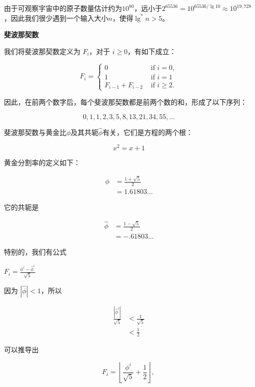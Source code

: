 \documentclass[lang=cn,newtx,10pt,scheme=chinese]{elegantbook}
\begin{document}
由于可观察宇宙中的原子数量估计约为$10^{80}$，远小于$2^{65536}=10^{65536 / \lg 10} \approx 10^{19,728}$，因此我们很少遇到一个输入大小$n$，使得$\lg ^* n>5$。

\textbf{斐波那契数}

我们将斐波那契数定义为 $F_i$，对于 $i \geq 0$，有如下成立：

\begin{equation}
F_i= \begin{cases}0 & \text { if } i=0, \\ 1 & \text { if } i=1 \\ F_{i-1}+F_{i-2} & \text { if } i \geq 2 .\end{cases}
\end{equation}

因此，在前两个数字后，每个斐波那契数都是前两个数的和，形成了以下序列：

$$
0,1,1,2,3,5,8,13,21,34,55,\ldots
$$

斐波那契数与黄金比$\phi$及其共轭$\hat{\phi}$有关，它们是方程的两个根：

$$
x^2=x+1
$$

黄金分割率的定义如下：

\begin{equation}
\begin{aligned}
\phi & =\frac{1+\sqrt{5}}{2} \\
& =1.61803 \ldots
\end{aligned}
\end{equation}

它的共轭是

\begin{equation}
\begin{aligned}
\widehat{\phi} & =\frac{1-\sqrt{5}}{2} \\
& =-.61803 \ldots
\end{aligned}
\end{equation}

特别的，我们有公式

$F_i=\frac{\phi^i-\widehat{\phi}^i}{\sqrt{5}}$

因为 $|\hat{\phi}|<1$，所以

$$
\begin{aligned}
\frac{\left|\hat{\phi}^i\right|}{\sqrt{5}} & <\frac{1}{\sqrt{5}} \\
& <\frac{1}{2}
\end{aligned}
$$

可以推导出

\begin{equation}
F_i=\left\lfloor\frac{\phi^i}{\sqrt{5}}+\frac{1}{2}\right\rfloor \text {, }
\end{equation}
\end{document}
